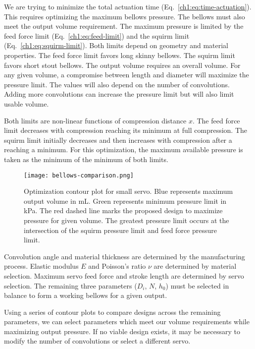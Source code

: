 We are trying to minimize the total actuation time
(Eq.~\ref{ch1:eq:time-actuation}). This requires optimizing the maximum
bellows pressure. The bellows must also meet the output volume
requirement. The maximum pressure is limited by the feed force limit
(Eq.~\ref{ch1:eq:feed-limit}) and the squirm limit
(Eq.~\ref{ch1:eq:squirm-limit}). Both limits depend on geometry and material
properties. The feed force limit favors long skinny bellows. The squirm
limit favors short stout bellows. The output volume requires an overall
volume. For any given volume, a compromise between length and diameter
will maximize the pressure limit. The values will also depend on the number of convolutions. Adding more
convolutions can increase the pressure limit but will also limit usable
volume.

Both limits are non-linear functions of compression distance \(x\). The
feed force limit decreases with compression reaching its minimum at
full compression. The squirm limit initially decreases and then
increases with compression after a reaching a minimum. For this
optimization, the maximum available pressure is taken as the minimum of
the minimum of both limits.

\begin{figure}
\hypertarget{ch1:fig:optimization-small}{%
\centering
\texttt{[image: bellows-comparison.png]}
\caption{Optimization contour plot for small servo. Blue represents
maximum output volume in mL. Green represents minimum pressure limit in
kPa. The red dashed line marks the proposed design to maximize pressure for given volume. The greatest pressure limit occurs at the
intersection of the squirm pressure limit and feed force pressure
limit.}\label{ch1:fig:optimization-small}
}
\end{figure}

Convolution angle and material thickness are determined by the
manufacturing process. Elastic modulus \(E\) and Poisson's ratio \(\nu\)
are determined by material selection. Maximum servo feed force and
stroke length are determined by servo selection. The remaining three
parameters (\(D_i\), \(N\), \(h_0\)) must be selected in balance to form
a working bellows for a given output.

Using a series of contour plots to compare designs across the remaining
parameters, we can select parameters which meet our volume requirements
while maximizing output pressure. If no viable design exists, it may be
necessary to modify the number of convolutions or select a different servo.

